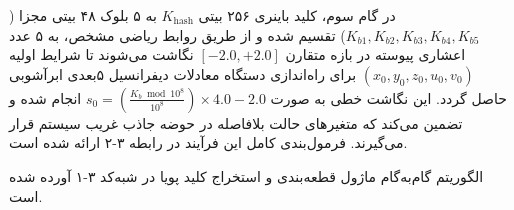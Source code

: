 

در گام سوم، کلید باینری ۲۵۶ بیتی $K_{\mathrm{hash}}$ به ۵ بلوک ۴۸ بیتی مجزا ($K_{b1},\allowbreak{} K_{b2},\allowbreak{} K_{b3},\allowbreak{} K_{b4},\allowbreak{} K_{b5}$) تقسیم شده و از طریق روابط ریاضی مشخص، به ۵ عدد اعشاری پیوسته در بازه متقارن $[-2.0, +2.0]$ نگاشت می‌شوند تا شرایط اولیه $(x_0,\allowbreak{} y_0,\allowbreak{} z_0,\allowbreak{} u_0,\allowbreak{} v_0)$ برای راه‌اندازی دستگاه معادلات دیفرانسیل ۵بعدی ابرآشوبی حاصل گردد. این نگاشت خطی به صورت $s_0 = \left( \frac{K_b \bmod 10^8}{10^8} \right) \times 4.0 - 2.0$ انجام شده و تضمین می‌کند که متغیرهای حالت بلافاصله در حوضه جاذب غریب  سیستم قرار می‌گیرند. فرمول‌بندی کامل این فرآیند در رابطه ۳{-}۲ ارائه شده است.\par






الگوریتم گام‌به‌گام ماژول قطعه‌بندی  و استخراج کلید پویا در شبه‌کد ۳{-}۱ آورده شده است.\par



